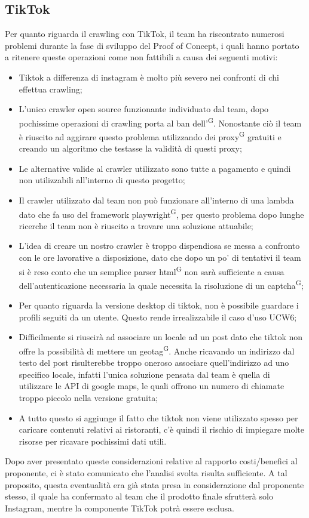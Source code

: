 \subsection{TikTok}
Per quanto riguarda il crawling con TikTok, il team ha riscontrato numerosi problemi durante la fase di sviluppo del Proof of Concept, i quali hanno portato a ritenere queste operazioni come non fattibili a causa dei seguenti motivi:
\begin{itemize}
    \item Tiktok a differenza di instagram è molto più severo nei confronti di chi effettua crawling;
    \item L'unico crawler open source funzionante individuato dal team, dopo pochissime operazioni di crawling porta al ban dell'\textsuperscript{G}. Nonostante ciò il team è riuscito ad aggirare questo problema utilizzando dei proxy\textsuperscript{G} gratuiti e creando un algoritmo che testasse la validità di questi proxy;
    \item Le alternative valide al crawler utilizzato sono tutte a pagamento e quindi non utilizzabili all'interno di questo progetto;
    \item Il crawler utilizzato dal team non può funzionare all'interno di una lambda dato che fa uso del framework playwright\textsuperscript{G}, per questo problema dopo lunghe ricerche il team non è riuscito a trovare una soluzione attuabile;
    \item L'idea di creare un nostro crawler è troppo dispendiosa se messa a confronto con le ore lavorative a disposizione, dato che dopo un po' di tentativi il team si è reso conto che un semplice parser html\textsuperscript{G} non sarà sufficiente a causa dell'autenticazione necessaria la quale necessita la risoluzione di un captcha\textsuperscript{G};
    \item Per quanto riguarda la versione desktop di tiktok, non è possibile guardare i profili seguiti da un utente. Questo rende irrealizzabile il caso d'uso UCW6;
    \item Difficilmente si riuscirà ad associare un locale ad un post dato che tiktok non offre la possibilità di mettere un geotag\textsuperscript{G}. Anche ricavando un indirizzo dal testo del post risulterebbe troppo oneroso associare quell'indirizzo ad uno specifico locale, infatti l'unica soluzione pensata dal team è quella di utilizzare le API di google maps, le quali offrono un numero di chiamate troppo piccolo nella versione gratuita;
    \item A tutto questo si aggiunge il fatto che tiktok non viene utilizzato spesso per caricare contenuti relativi ai ristoranti, c’è quindi il rischio di impiegare molte risorse per ricavare pochissimi dati utili.
\end{itemize}
Dopo aver presentato queste considerazioni relative al rapporto costi/benefici al proponente, ci è stato comunicato che l’analisi svolta risulta sufficiente. A tal proposito,  questa eventualità era già stata presa in considerazione dal proponente stesso, il quale ha confermato al team che il prodotto finale sfrutterà solo Instagram, mentre la componente TikTok potrà essere esclusa.